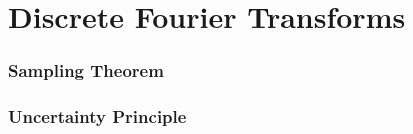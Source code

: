 \part{Discrete Fourier Transforms}
\section{Sampling Theorem}

\section{Uncertainty Principle}

%
%
%
%
\nocite{morseVolOne}
\nocite{textbook}
